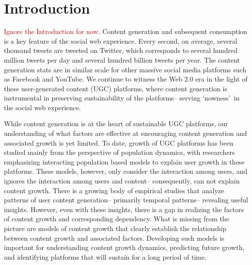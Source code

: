 \section{Introduction}
\textcolor{red}{Ignore the Introduction for now.}
Content generation and subsequent consumption is a key feature of the social web experience. Every second, on average, several thousand tweets are tweeted on Twitter, which corresponds to several hundred million tweets per day and several hundred billion tweets per year. The content generation stats are in similar scale for other massive social media platforms such as Facebook and YouTube. We continue to witness the Web 2.0 era in the light of these user-generated content (UGC) platforms, where content generation is instrumental in preserving sustainability of the platforms-- serving \lq nowness\rq\ in the social web experience. 

While content generation is at the heart of sustainable UGC platforms, our understanding of what factors are effective at encouraging content generation and associated growth is yet limited. To date, growth of UGC platforms has been studied mainly from the perspective of population dynamics, with researchers emphasizing interacting population based models to explain user growth in these platforms. These models, however, only consider the interaction among users, and ignores the interaction among users and content-- consequently, can not explain content growth. There is a growing body of empirical studies that analyze patterns of user content generation-- primarily temporal patterns-- revealing useful insights. However, even with these insights, there is a gap in realizing the factors of content growth and corresponding dependency. What is missing from the picture are models of content growth that clearly establish the relationship between content growth and associated factors. Developing such models is important for understanding content growth dynamics, predicting future growth, and identifying platforms that will sustain for a long period of time.